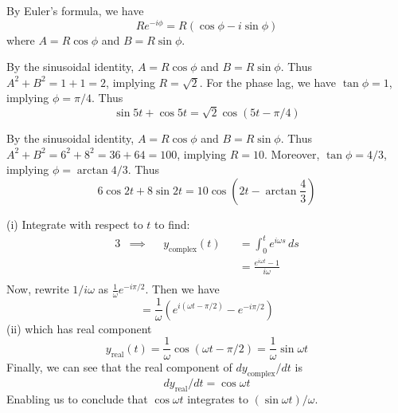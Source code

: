 \documentclass[a4paper]{article}
\begin{document}
By Euler's formula, we have
\[
	Re^{-i \phi } = R \!\left( \cos \phi - i \sin \phi \right) 
\]
where \(A = R \cos \phi \) and \(B = R \sin \phi \).


By the sinusoidal identity, \(A = R \cos \phi \) and \(B = R \sin \phi \). Thus \(A^{2} + B^{2} = 1 + 1 = 2\), implying \(R = \sqrt{2}\). For the phase lag, we have \(\tan \phi = 1\), implying \(\phi = \pi /4\). Thus
\[
	\sin 5t + \cos 5t = \sqrt{2} \cos\left( 5t - \pi /4 \right)
\]


By the sinusoidal identity, \(A = R \cos \phi \) and \(B = R \sin \phi \). Thus \(A^{2} + B^{2} = 6^{2} + 8^{2} = 36 + 64 = 100\), implying \(R = 10\). Moreover, \(\tan \phi = 4/3\), implying \(\phi = \arctan 4/3\). Thus
\[
	6 \cos 2t + 8 \sin 2t = 10 \cos\left( 2t - \arctan \frac{4}{3} \right)
\]


(i) Integrate with respect to \(t\) to find:
\begin{alignat*}{3}
	&\implies && y_{\text{complex}} \!\left( t \right)  && = \int^{t}_{0} e^{i \omega s} \, ds   \\
	& && && = \frac{e^{i \omega t} - 1}{i \omega } \\ 
\end{alignat*}
Now, rewrite \(1/i \omega \) as \(\frac{1}{\omega } e^{-i \pi /2}\). Then we have
\[
	= \frac{1}{\omega } \!\left( e^{i \!\left( \omega t - \pi / 2 \right) } - e^{-i \pi / 2} \right) 
\]
(ii) which has real component
\[
	y_{\text{real}} \!\left( t \right) = \frac{1}{\omega } \cos\left( \omega t - \pi / 2 \right) = \frac{1}{\omega } \sin \omega t 
\]
Finally, we can see that the real component of \(dy_{\text{complex}} / dt\) is
\[
	dy_{\text{real}} / dt = \cos \omega t
\]
Enabling us to conclude that \(\cos \omega t\) integrates to \(\!\left( \sin \omega t \right) / \omega \).
\end{document}
